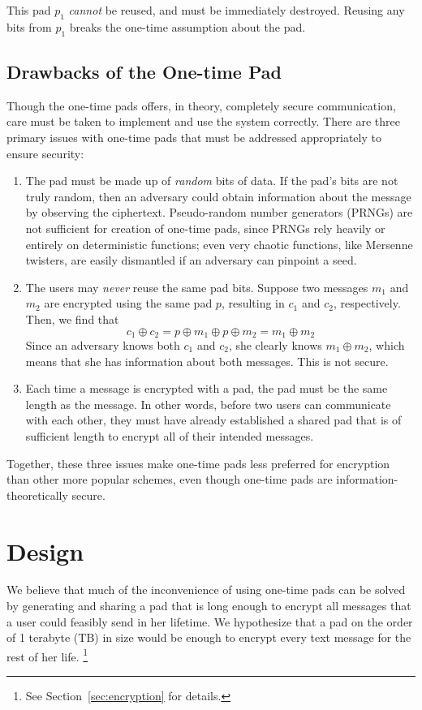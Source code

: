 \documentclass[twocolumn]{article}
\begin{document}
This pad $p_1$ \emph{cannot} be reused, and must be immediately destroyed. Reusing any bits from $p_1$ breaks the one-time assumption about the pad.

\subsection{Drawbacks of the One-time Pad}
Though the one-time pads offers, in theory, completely secure communication, care must be taken to implement and use the system correctly. There are three primary issues with one-time pads that must be addressed appropriately to ensure security:
\begin{enumerate}
\item The pad must be made up of \emph{random} bits of data. If the pad's bits are not truly random, then an adversary could obtain information about the message by observing the ciphertext. Pseudo-random number generators (PRNGs) are not sufficient for creation of one-time pads, since PRNGs rely heavily or entirely on deterministic functions; even very chaotic functions, like Mersenne twisters, are easily dismantled if an adversary can pinpoint a seed.
\item The users may \emph{never} reuse the same pad bits. Suppose two messages $m_{1}$ and $m_{2}$ are encrypted using the same pad $p$, resulting in $c_1$ and $c_2$, respectively. Then, we find that
\[
c_{1} \oplus c_{2} = p \oplus m_{1} \oplus p \oplus m_{2}
= m_1 \oplus m_2
\]
Since an adversary knows both $c_1$ and $c_2$, she clearly knows $m_1 \oplus m_2$, which means that she has information about both messages. This is not secure.
\item Each time a message is encrypted with a pad, the pad must be the same length as the message. In other words, before two users can communicate with each other, they must have already established a shared pad that is of sufficient length to encrypt all of their intended messages.
\end{enumerate}
Together, these three issues make one-time pads less preferred for encryption than other more popular schemes, even though one-time pads are information-theoretically secure.

\section{Design}
We believe that much of the inconvenience of using one-time pads can be solved by generating and sharing a pad that is long enough to encrypt all messages that a user could feasibly send in her lifetime. We hypothesize that a pad on the order of 1 terabyte (TB) in size would be enough to encrypt every text message for the rest of her life. \footnote{
See Section~\ref{sec:encryption} for details.
}
\end{document}

